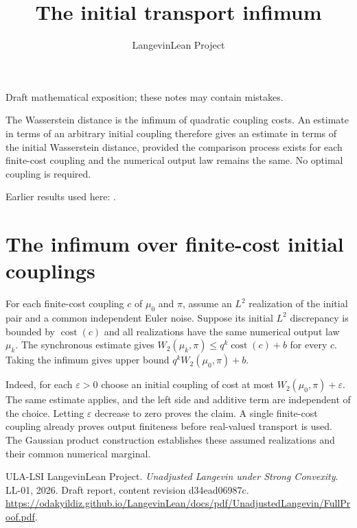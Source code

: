 \documentclass[11pt,a4paper]{article}
\title{\texorpdfstring{The initial transport infimum}{The initial transport infimum}}
\author{LangevinLean Project}
\date{}
\begin{document}
\maketitle
Draft mathematical exposition; these notes may contain mistakes.


The Wasserstein distance is the infimum of quadratic coupling costs. An estimate in terms of an arbitrary initial coupling therefore gives an estimate in terms of the initial Wasserstein distance, provided the comparison process exists for each finite-cost coupling and the numerical output law remains the same. No optimal coupling is required.




Earlier results used here: \cite[Section~3.47]{LangevinLean2026ULASC}.

\section{\texorpdfstring{The infimum over finite-cost initial couplings}{The infimum over finite-cost initial couplings}}


For each finite-cost coupling \(c\) of \(\mu_0\) and \(\pi\), assume an \(L^2\) realization of the initial pair and a common independent Euler noise. Suppose its initial \(L^2\) discrepancy is bounded by \(\operatorname{cost}(c)\) and all realizations have the same numerical output law \(\mu_k\). The synchronous estimate gives \(W_2(\mu_k,\pi)\le q^k\operatorname{cost}(c)+b\) for every \(c\). Taking the infimum gives upper bound \(q^kW_2(\mu_0,\pi)+b\).



Indeed, for each \(\varepsilon>0\) choose an initial coupling of cost at most \(W_2(\mu_0,\pi)+\varepsilon\). The same estimate applies, and the left side and additive term are independent of the choice. Letting \(\varepsilon\) decrease to zero proves the claim. A single finite-cost coupling already proves output finiteness before real-valued transport is used. The Gaussian product construction establishes these assumed realizations and their common numerical marginal.



\begin{thebibliography}{ULA-LSI}
LangevinLean Project. \emph{Unadjusted Langevin under Strong Convexity}. LL-01, 2026. Draft report, content revision d34ead06987c. \url{https://odakyildiz.github.io/LangevinLean/docs/pdf/UnadjustedLangevin/FullProof.pdf}.
\end{thebibliography}
\end{document}
